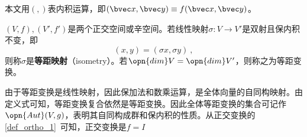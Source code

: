 本文用$(,)$表内积运算，即$(\bvec x,\bvec y)\equiv f(\bvec x,\bvec y) $。
\begin{definition}{}
$(V,f),(V',f')$是两个正交空间或辛空间。若线性映射$\sigma:V\rightarrow V'$是双射且保内积不变，即\begin{equation}
(x,y)=(\sigma x,\sigma y)~,
\end{equation}
则称$\sigma $是\textbf{等距映射}（isometry）。若$\opn{dim}V=\opn{dim}V'$，则称之为等距变换。
\end{definition}
由于等距变换是线性映射，因此保加法和数乘运算，是全体向量的自同构映射。由定义式可知，等距变换复合依然是等距变换。因此全体等距变换的集合可记作$\opn{Aut}(V,g)$，表明其自同构成群和保内积的性质。从正交变换的\autoref{def_ortho_1}~可知，正交变换是$f=I$
